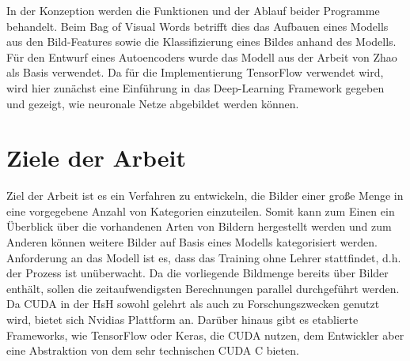 In der Konzeption werden die Funktionen und der Ablauf beider Programme behandelt. Beim Bag of Visual Words betrifft dies das Aufbauen eines Modells aus den Bild-Features sowie die Klassifizierung eines Bildes anhand des Modells. Für den Entwurf eines Autoencoders wurde das Modell aus der Arbeit von Zhao \todo{[REF]} als Basis verwendet. Da für die Implementierung TensorFlow verwendet wird, wird hier zunächst eine Einführung in das Deep-Learning Framework gegeben und gezeigt, wie neuronale Netze abgebildet werden können. 

\section{Ziele der Arbeit}

Ziel der Arbeit ist es ein Verfahren zu entwickeln, die Bilder einer große Menge in eine vorgegebene Anzahl von Kategorien einzuteilen. Somit kann zum Einen ein Überblick über die vorhandenen Arten von Bildern hergestellt werden und zum Anderen können weitere Bilder auf Basis eines Modells kategorisiert werden. Anforderung an das Modell ist es, dass das Training ohne Lehrer stattfindet, d.h. der Prozess ist unüberwacht. Da die vorliegende Bildmenge bereits über  Bilder enthält, sollen die zeitaufwendigsten Berechnungen parallel durchgeführt werden. Da CUDA in der HsH sowohl gelehrt als auch zu Forschungszwecken genutzt wird, bietet sich Nvidias Plattform an. Darüber hinaus gibt es etablierte Frameworks, wie TensorFlow oder Keras, die CUDA nutzen, dem Entwickler aber eine Abstraktion von dem sehr technischen CUDA C bieten.  

